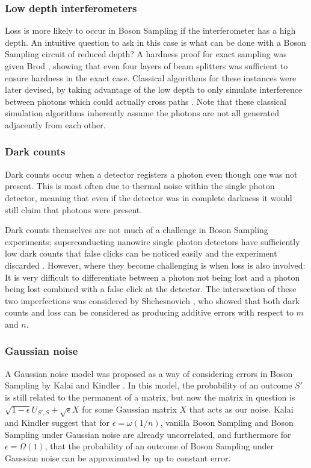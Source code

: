 \subsubsection{Low depth interferometers}

Loss is more likely to occur in Boson Sampling if the interferometer has a high depth. An intuitive question to ask in this case is what can be done with a Boson Sampling circuit of reduced depth? A hardness proof for exact sampling was given Brod \cite{brod2015}, showing that even four layers of beam splitters was sufficient to ensure hardness in the exact case. Classical algorithms for these instances were later devised, by taking advantage of the low depth to only simulate interference between photons which could actually cross paths \cite{deshpande2018, maskara2019}. Note that these classical simulation algorithms inherently assume the photons are not all generated adjacently from each other.

\subsubsection{Dark counts}

Dark counts occur when a detector registers a photon even though one was not present. This is most often due to thermal noise within the single photon detector, meaning that even if the detector was in complete darkness it would still claim that photons were present.

Dark counts themselves are not much of a challenge in Boson Sampling experiments; superconducting nanowire single photon detectors have sufficiently low dark counts that false clicks can be noticed easily and the experiment discarded \cite{kitaygorsky2005}. However, where they become challenging is when loss is also involved: It is very difficult to differentiate between a photon not being lost and a photon being lost combined with a false click at the detector. The intersection of these two imperfections was considered by Shchesnovich \cite{shchesnovich2014darkcounts}, who showed that both dark counts and loss can be considered as producing additive errors with respect to $m$ and $n$.

\subsubsection{Gaussian noise}

A Gaussian noise model was proposed as a way of considering errors in Boson Sampling by Kalai and Kindler \cite{kalai2014}. In this model, the probability of an outcome $S'$ is still related to the permanent of a matrix, but now  the matrix in question is $\sqrt{1-\epsilon}U_{S',S}+\sqrt{\epsilon}X$ for some Gaussian matrix $X$ that acts as our noise. Kalai and Kindler suggest that for $\epsilon=\omega(1/n)$, vanilla Boson Sampling and Boson Sampling under Gaussian noise are already uncorrelated, and furthermore for $\epsilon = \Omega(1)$, that the probability of an outcome of Boson Sampling under Gaussian noise can be approximated by up to constant error.

